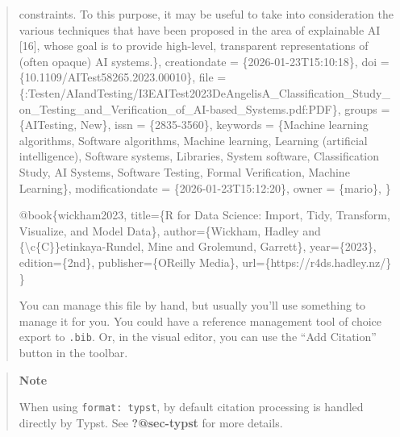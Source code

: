 \documentclass[
  letterpaper,
  DIV=11,
  numbers=noendperiod,
  oneside]{scrreprt}
\newenvironment{Shaded}{\begin{snugshade}}{\end{snugshade}}
\newcommand{\CharTok}[1]{\textcolor[rgb]{0.13,0.47,0.30}{#1}}
\newcommand{\DataTypeTok}[1]{\textcolor[rgb]{0.68,0.00,0.00}{#1}}
\newcommand{\NormalTok}[1]{\textcolor[rgb]{0.00,0.23,0.31}{#1}}
\newcommand{\OtherTok}[1]{\textcolor[rgb]{0.00,0.23,0.31}{#1}}
\newcommand{\VariableTok}[1]{\textcolor[rgb]{0.07,0.07,0.07}{#1}}
\begin{document}
\begin{tcolorbox}
\begin{quote}
\begin{codelisting}[H]
\begin{Shaded}
\begin{Highlighting}[]
\NormalTok{constraints. To this purpose, it may be useful to take into consideration the various techniques that have been proposed in the area of explainable AI [16], whose goal is to provide high{-}level, transparent representations of (often opaque) AI systems.\},}
  \DataTypeTok{creationdate}\NormalTok{     = \{2026{-}01{-}23T15:10:18\},}
  \DataTypeTok{doi}\NormalTok{              = \{10.1109/AITest58265.2023.00010\},}
  \DataTypeTok{file}\NormalTok{             = \{:Testen/AIandTesting/I3EAITest2023DeAngelisA\_Classification\_Study\_on\_Testing\_and\_Verification\_of\_AI{-}based\_Systems.pdf:PDF\},}
  \DataTypeTok{groups}\NormalTok{           = \{AITesting, New\},}
  \DataTypeTok{issn}\NormalTok{             = \{2835{-}3560\},}
  \DataTypeTok{keywords}\NormalTok{         = \{Machine learning algorithms, Software algorithms, Machine learning, Learning (artificial intelligence), Software systems, Libraries, System software, Classification Study, AI Systems, Software Testing, Formal Verification, Machine Learning\},}
  \DataTypeTok{modificationdate}\NormalTok{ = \{2026{-}01{-}23T15:12:20\},}
  \DataTypeTok{owner}\NormalTok{            = \{mario\},}
\NormalTok{\}}

\VariableTok{@book}\NormalTok{\{}\OtherTok{wickham2023}\NormalTok{,}
  \DataTypeTok{title}\NormalTok{=\{R for Data Science: Import, Tidy, Transform, Visualize, and Model Data\},}
  \DataTypeTok{author}\NormalTok{=\{Wickham, Hadley and \{}\CharTok{\textbackslash{}c}\NormalTok{\{C\}\}etinkaya{-}Rundel, Mine and Grolemund, Garrett\},}
  \DataTypeTok{year}\NormalTok{=\{2023\},}
  \DataTypeTok{edition}\NormalTok{=\{2nd\},}
  \DataTypeTok{publisher}\NormalTok{=\{O\textquotesingle{}Reilly Media\},}
  \DataTypeTok{url}\NormalTok{=\{https://r4ds.hadley.nz/\}}
\NormalTok{\}}
\end{Highlighting}
\end{Shaded}

\end{codelisting}

You can manage this file by hand, but usually you'll use something to
manage it for you. You could have a reference management tool of choice
export to \texttt{.bib}. Or, in the visual editor, you can use the ``Add
Citation'' button in the toolbar.
\end{quote}

\begin{quote}
\textbf{Note}

When using \texttt{format:\ typst}, by default citation processing is
handled directly by Typst. See \textbf{?@sec-typst} for more details.
\end{quote}


\end{tcolorbox}
\end{document}
